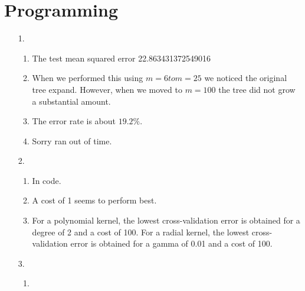 \documentclass{article}
\begin{document}
\section{Programming}
\begin{enumerate}
    \item [1. ]
    
    \begin{enumerate}
        \item 
        
        The test mean squared error 22.863431372549016
        
        \item
        
        When we performed this using $m=6 to m = 25$ we noticed the original tree expand. However, when we moved to $m = 100$ the tree did not grow a substantial amount.
        
        \item
        
        The error rate is about $19.2\%$.
        
        \item
        
        Sorry ran out of time.
        
    \end{enumerate}
    
    \item [2. ]
    
    \begin{enumerate}
        \item 
        
        In code.
        
        \item
        
        A cost of 1 seems to perform best.
        
        \item
        
        For a polynomial kernel, the lowest cross-validation error is obtained for a degree of 2 and a cost of 100. For a radial kernel, the lowest cross-validation error is obtained for a gamma of 0.01 and a cost of 100.
        
    \end{enumerate}
    
    \item [3. ]
    
    \begin{enumerate}
        \item 
        

\end{enumerate}
\end{enumerate}
\end{document}
